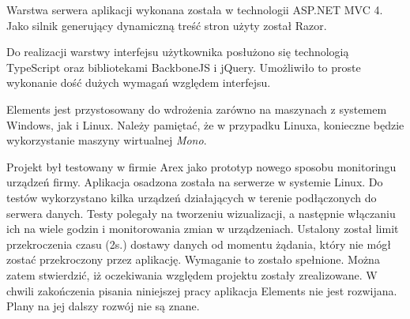 Warstwa serwera aplikacji wykonana została w technologii ASP.NET MVC 4. Jako silnik generujący dynamiczną treść stron użyty został Razor. 

Do realizacji warstwy interfejsu użytkownika posłużono się technologią TypeScript oraz bibliotekami BackboneJS i jQuery. Umożliwiło to proste wykonanie dość dużych wymagań względem interfejsu.

Elements jest przystosowany do wdrożenia zarówno na maszynach z systemem Windows, jak i Linux. Należy pamiętać, że w przypadku Linuxa, konieczne będzie wykorzystanie maszyny wirtualnej \textit{Mono}.

Projekt był testowany w firmie Arex jako prototyp nowego sposobu monitoringu urządzeń firmy. Aplikacja osadzona została na serwerze w systemie Linux. Do testów wykorzystano kilka urządzeń działających w terenie podłączonych do serwera danych. Testy polegały na tworzeniu wizualizacji, a następnie włączaniu ich na wiele godzin i monitorowania zmian w urządzeniach. Ustalony został limit przekroczenia czasu (2s.) dostawy danych od momentu żądania, który nie mógł zostać przekroczony przez aplikację. Wymaganie to zostało spełnione. Można zatem stwierdzić, iż oczekiwania względem projektu zostały zrealizowane. W chwili zakończenia pisania niniejszej pracy aplikacja Elements nie jest rozwijana. Plany na jej dalszy rozwój nie są znane.


